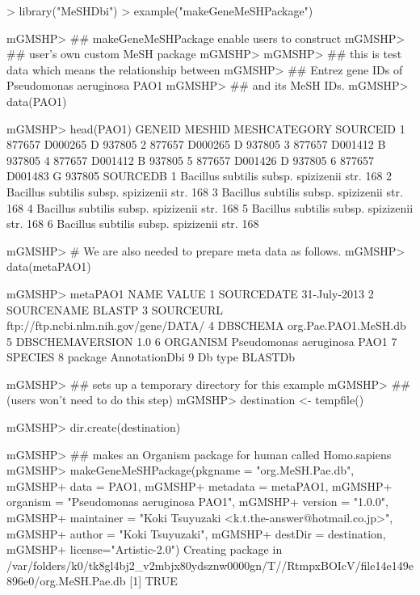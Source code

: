 \documentclass[11pt]{article}
\begin{document}
\begin{center}
\begin{Schunk}
\begin{Sinput}
> library("MeSHDbi")
> example("makeGeneMeSHPackage")
\end{Sinput}
\begin{Soutput}
mGMSHP> ## makeGeneMeSHPackage enable users to construct
mGMSHP> ## user's own custom MeSH package
mGMSHP> 
mGMSHP> ## this is test data which means the relationship between
mGMSHP> ## Entrez gene IDs of Pseudomonas aeruginosa PAO1
mGMSHP> ## and its MeSH IDs.
mGMSHP> data(PAO1)

mGMSHP> head(PAO1)
  GENEID  MESHID MESHCATEGORY SOURCEID
1 877657 D000265            D   937805
2 877657 D000265            D   937805
3 877657 D001412            B   937805
4 877657 D001412            B   937805
5 877657 D001426            D   937805
6 877657 D001483            G   937805
                                      SOURCEDB
1 Bacillus subtilis subsp. spizizenii str. 168
2 Bacillus subtilis subsp. spizizenii str. 168
3 Bacillus subtilis subsp. spizizenii str. 168
4 Bacillus subtilis subsp. spizizenii str. 168
5 Bacillus subtilis subsp. spizizenii str. 168
6 Bacillus subtilis subsp. spizizenii str. 168

mGMSHP> # We are also needed to prepare meta data as follows.
mGMSHP> data(metaPAO1)

mGMSHP> metaPAO1
             NAME                                 VALUE
1      SOURCEDATE                          31-July-2013
2      SOURCENAME                                BLASTP
3       SOURCEURL ftp://ftp.ncbi.nlm.nih.gov/gene/DATA/
4        DBSCHEMA                  org.Pae.PAO1.MeSH.db
5 DBSCHEMAVERSION                                   1.0
6        ORGANISM           Pseudomonas aeruginosa PAO1
7         SPECIES                                      
8         package                         AnnotationDbi
9         Db type                               BLASTDb

mGMSHP> ## sets up a temporary directory for this example
mGMSHP> ## (users won't need to do this step)
mGMSHP> destination <- tempfile()

mGMSHP> dir.create(destination)

mGMSHP> ## makes an Organism package for human called Homo.sapiens
mGMSHP> makeGeneMeSHPackage(pkgname = "org.MeSH.Pae.db",
mGMSHP+ 					data = PAO1,
mGMSHP+           metadata = metaPAO1,
mGMSHP+ 					organism = "Pseudomonas aeruginosa PAO1",
mGMSHP+ 					version = "1.0.0",
mGMSHP+ 					maintainer = "Koki Tsuyuzaki <k.t.the-answer@hotmail.co.jp>",
mGMSHP+ 					author = "Koki Tsuyuzaki",
mGMSHP+ 					destDir = destination,
mGMSHP+ 					license="Artistic-2.0")
Creating package in /var/folders/k0/tk8gl4bj2_v2mbjx80ydsznw0000gn/T//RtmpxBOIcV/file14e149e896e0/org.MeSH.Pae.db 
[1] TRUE
\end{Soutput}
\end{Schunk}
\end{center}
\end{document}
